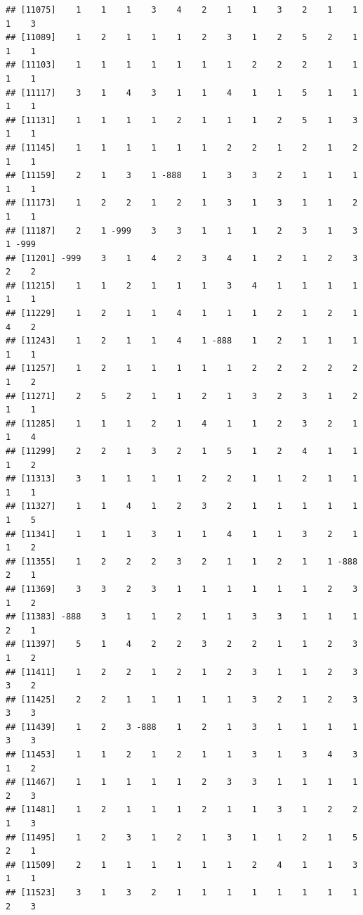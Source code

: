 \documentclass[
  12pt,
  openany]{book}
\begin{document}
\begin{verbatim}
## [11075]    1    1    1    3    4    2    1    1    3    2    1    1    1    3
## [11089]    1    2    1    1    1    2    3    1    2    5    2    1    1    1
## [11103]    1    1    1    1    1    1    1    2    2    2    1    1    1    1
## [11117]    3    1    4    3    1    1    4    1    1    5    1    1    1    1
## [11131]    1    1    1    1    2    1    1    1    2    5    1    3    1    1
## [11145]    1    1    1    1    1    1    2    2    1    2    1    2    1    1
## [11159]    2    1    3    1 -888    1    3    3    2    1    1    1    1    1
## [11173]    1    2    2    1    2    1    3    1    3    1    1    2    1    1
## [11187]    2    1 -999    3    3    1    1    1    2    3    1    3    1 -999
## [11201] -999    3    1    4    2    3    4    1    2    1    2    3    2    2
## [11215]    1    1    2    1    1    1    3    4    1    1    1    1    1    1
## [11229]    1    2    1    1    4    1    1    1    2    1    2    1    4    2
## [11243]    1    2    1    1    4    1 -888    1    2    1    1    1    1    1
## [11257]    1    2    1    1    1    1    1    2    2    2    2    2    1    2
## [11271]    2    5    2    1    1    2    1    3    2    3    1    2    1    1
## [11285]    1    1    1    2    1    4    1    1    2    3    2    1    1    4
## [11299]    2    2    1    3    2    1    5    1    2    4    1    1    1    2
## [11313]    3    1    1    1    1    2    2    1    1    2    1    1    1    1
## [11327]    1    1    4    1    2    3    2    1    1    1    1    1    1    5
## [11341]    1    1    1    3    1    1    4    1    1    3    2    1    1    2
## [11355]    1    2    2    2    3    2    1    1    2    1    1 -888    2    1
## [11369]    3    3    2    3    1    1    1    1    1    1    2    3    1    2
## [11383] -888    3    1    1    2    1    1    3    3    1    1    1    2    1
## [11397]    5    1    4    2    2    3    2    2    1    1    2    3    1    2
## [11411]    1    2    2    1    2    1    2    3    1    1    2    3    3    2
## [11425]    2    2    1    1    1    1    1    3    2    1    2    3    3    3
## [11439]    1    2    3 -888    1    2    1    3    1    1    1    1    3    3
## [11453]    1    1    2    1    2    1    1    3    1    3    4    3    1    2
## [11467]    1    1    1    1    1    2    3    3    1    1    1    1    2    3
## [11481]    1    2    1    1    1    2    1    1    3    1    2    2    1    3
## [11495]    1    2    3    1    2    1    3    1    1    2    1    5    2    1
## [11509]    2    1    1    1    1    1    1    2    4    1    1    3    1    1
## [11523]    3    1    3    2    1    1    1    1    1    1    1    1    2    3

\end{verbatim}
\end{document}
